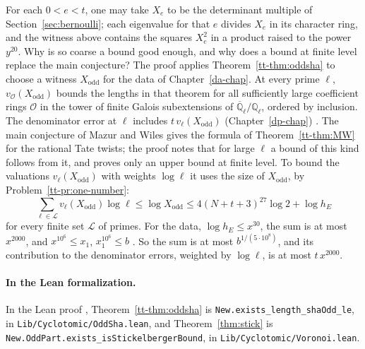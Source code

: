 \documentclass[reqno]{amsart}
\newcounter{chap}
\theoremstyle{definition}
\theoremstyle{plain}
\newcommand{\Q}{\mathbb{Q}}
\newcommand{\Ql}{\Q_\ell}
\newcommand{\Oc}{\mathcal{O}}
\newcommand{\tl}[1]{\texttt{#1}}
\begin{document}
For each \(0<e<t\), one may take \(X_e\) to be the determinant multiple of Section~\ref{sec:bernoulli}; each eigenvalue for that \(e\) divides \(X_e\) in its character ring, and the witness above contains the squares \(X_e^2\) in a product raised to the power \(y^{20}\).  Why is so coarse a bound good enough, and why does a bound at finite level replace the main conjecture?  The proof applies Theorem~\ref{tt-thm:oddsha} to choose a witness \(X_{\mathrm{odd}}\) for the data of Chapter~\ref{da-chap}.  At every prime \(\ell\), \(v_\Oc(X_{\mathrm{odd}})\) bounds the lengths in that theorem for all sufficiently large coefficient rings \(\Oc\) in the tower of finite Galois subextensions of \(\overline{\Q}_\ell/\Ql\), ordered by inclusion.  The denominator error at \(\ell\) includes \(t\,v_\ell(X_{\mathrm{odd}})\) (Chapter~\ref{dp-chap}) \cite{GL}.  The main conjecture of Mazur and Wiles \cite{MW} gives the formula of Theorem~\ref{tt-thm:MW} for the rational Tate twists; the proof notes that for large \(\ell\) a bound of this kind follows from it, and proves only an upper bound at finite level.  To bound the valuations \(v_\ell(X_{\mathrm{odd}})\) with weights \(\log\ell\) it uses the size of \(X_{\mathrm{odd}}\), by Problem~\ref{tt-pr:one-number}:
\[
 \sum_{\ell\in\mathcal L}v_\ell(X_{\mathrm{odd}})\log\ell\le\log X_{\mathrm{odd}}\le4(N+t+3)^{27}\log2+\log h_E
\]
for every finite set \(\mathcal L\) of primes.  For the data, \(\log h_E\le x^{30}\), the sum is at most \(x^{2000}\), and \(x^{10^6}\le x_1\), \(x_1^{10^6}\le b\) \cite{GL}.  So the sum is at most \(b^{1/(5\cdot10^8)}\), and its contribution to the denominator errors, weighted by \(\log\ell\), is at most \(t\,x^{2000}\).

\paragraph{In the Lean formalization.}
In the Lean proof \cite{GL}, Theorem~\ref{tt-thm:oddsha} is \tl{New.\allowbreak{}exists\_\allowbreak{}length\_\allowbreak{}shaOdd\_\allowbreak{}le}, in \tl{Lib/\allowbreak{}Cyclotomic/\allowbreak{}OddSha.lean}, and Theorem~\ref{thm:stick} is \tl{New.\allowbreak{}OddPart.\allowbreak{}exists\_\allowbreak{}isStickelbergerBound}, in \tl{Lib/\allowbreak{}Cyclotomic/\allowbreak{}Voronoi.lean}.
\end{document}
